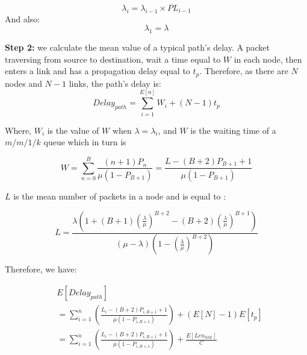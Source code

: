 \documentclass[conference]{IEEEtran}
\begin{document}
    \begin{equation}
        \lambda_i=\lambda_{i-1} \times PL_{i-1}
    \end{equation}
    And also:
    \begin{equation}
        \lambda_1=\lambda
    \end{equation}

    \textbf{Step 2:} we calculate the mean value of a typical path's delay. A packet traversing from source to destination, wait a time equal to $W$ in each node, then enters a link and has a propagation delay equal to $t_p$. Therefore, as there are $N$ nodes and $N-1$ links, the path's delay is:
    \begin{equation}
        Delay_{path}=\sum_{i=1}^{E\left[n\right]}W_i+\left(N-1\right)t_p
    \end{equation}

    Where, $W_i$ is the value of $W$ when $\lambda=\lambda_i$, and $W$ is the waiting time of a $m/m/1/k$ queue which in turn is \cite{b4}

    \begin{equation}
        W=\sum_{n=0}^B\frac{\left(n+1\right)P_n}
        {\mu\left(1-P_{B+1}\right)}=\frac{L-\left(B+2\right)P_{B+1}+1}{\mu\left(1-P_{B+1}\right)}
    \end{equation}

    $L$ is the mean number of packets in a node and is equal to \cite{b4}:

    \begin{equation}
        L=\frac{\lambda\left(1+\left(B+1\right)\left(\frac{\lambda}{\mu}\right)^{B+2}-\left(B+2\right)\left(\frac{\lambda}{\mu}\right)^{B+1}\right)}{\left(\mu-\lambda\right)\left(1-\left(\frac{\lambda}{\mu}\right)^{B+2}\right)}
    \end{equation}

    Therefore, we have:

    \begin{equation}
        \begin{split}
            &E\left[Delay_{path}\right]\\&=\sum_{i=1}^n\left(\frac{L_i-\left(B+2\right)P_{i,B+1}+1}{\mu\left(1-P_{i,B+1}\right)}\right)+\left(E\left[N\right]-1\right)E\left[t_p\right]\\&=\sum_{i=1}^n\left(\frac{L_i-\left(B+2\right)P_{i,B+1}+1}{\mu\left(1-P_{i,B+1}\right)}\right)+\frac{E\left[Len_{link}\right]}{C}
        \end{split}
    \end{equation}
\end{document}
